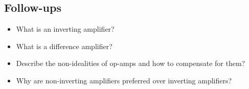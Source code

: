 \documentclass[main.tex]{subfiles}
\begin{document}

\subsection{Follow-ups}
\begin{itemize}
    \item What is an inverting amplifier?
    \item What is a difference amplifier?
    \item Describe the non-idealities of op-amps and how to compensate for them? %
    \item Why are non-inverting amplifiers preferred over inverting amplifiers? %
\end{itemize}
\end{document}

